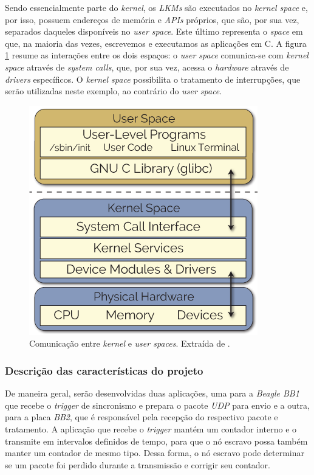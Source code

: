 \vspace{12pt}

Sendo essencialmente parte do \textit{kernel}, os \textit{LKMs} são executados
no \textit{kernel space} e, por isso, possuem endereços de memória e
\textit{APIs} próprios, que são, por sua vez, separados daqueles
disponíveis no \textit{user space}. Este último representa o \textit{space} em
que, na maioria das vezes, escrevemos e executamos as aplicações em C. A figura
\ref{fig:derek_kernel_user} resume as interações entre os dois espaços: o
\textit{user space} comunica-se com \textit{kernel space} através de
\textit{system calls}, que, por sua vez, acessa o \textit{hardware} através de
\textit{drivers} específicos. O \textit{kernel space} possibilita o tratamento
de interrupções, que serão utilizadas neste exemplo, ao contrário do
\textit{user space}.

\begin{figure}[h]

\centering
\includegraphics[scale=0.45]{image/userspace-kernelspace}
\caption {Comunicação entre \textit{kernel} e \textit{user spaces}. Extraída de
\cite{derek}.}
\label{fig:derek_kernel_user}
\end{figure}

\subsubsection{Descrição das características do projeto}

De maneira geral, serão desenvolvidas duas aplicações, uma para a \textit{Beagle
BB1} que recebe o \textit{trigger} de sincronismo e prepara o pacote
\textit{UDP} para envio e a outra, para a placa \textit{BB2}, que é responsável
pela recepção do respectivo pacote e tratamento. A aplicação que recebe o
\textit{trigger} mantém um contador interno e o transmite em intervalos
definidos de tempo, para que o nó escravo possa também manter um contador
de mesmo tipo. Dessa forma, o nó escravo pode determinar se um pacote foi
perdido durante a transmissão e corrigir seu contador.

